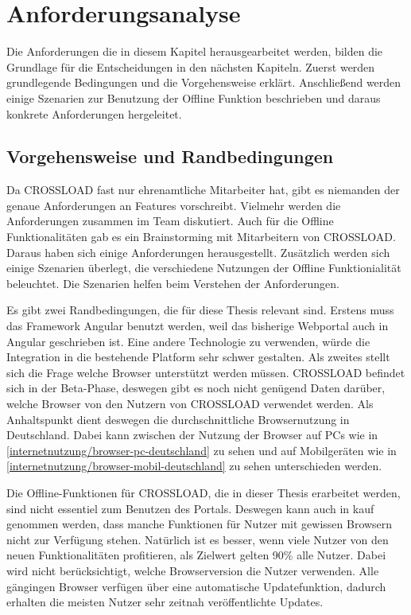 \chapter{Anforderungsanalyse}
\label{Kap3}
Die Anforderungen die in diesem Kapitel herausgearbeitet werden, bilden die Grundlage für die Entscheidungen in den nächsten Kapiteln. Zuerst werden grundlegende Bedingungen und die Vorgehensweise erklärt. Anschließend werden einige Szenarien zur Benutzung der Offline Funktion beschrieben und daraus konkrete Anforderungen hergeleitet.

\section{Vorgehensweise und Randbedingungen}
Da CROSSLOAD fast nur ehrenamtliche Mitarbeiter hat, gibt es niemanden der genaue Anforderungen an Features vorschreibt. Vielmehr werden die Anforderungen zusammen im Team diskutiert. Auch für die Offline Funktionalitäten gab es ein Brainstorming mit Mitarbeitern von CROSSLOAD. Daraus haben sich einige Anforderungen herausgestellt. Zusätzlich werden sich einige Szenarien überlegt, die verschiedene Nutzungen der Offline Funktionialität beleuchtet. Die Szenarien helfen beim Verstehen der Anforderungen.

Es gibt zwei Randbedingungen, die für diese Thesis relevant sind. Erstens muss das Framework Angular benutzt werden, weil das bisherige Webportal auch in Angular geschrieben ist. Eine andere Technologie zu verwenden, würde die Integration in die bestehende Platform sehr schwer gestalten. Als zweites stellt sich die Frage welche Browser unterstützt werden müssen. CROSSLOAD befindet sich in der Beta-Phase, deswegen gibt es noch nicht genügend Daten darüber, welche Browser von den Nutzern von CROSSLOAD verwendet werden. Als Anhaltspunkt dient deswegen die durchschnittliche Browsernutzung in Deutschland. Dabei kann zwischen der Nutzung der Browser auf PCs wie in \autoref{internetnutzung/browser-pc-deutschland} zu sehen und auf Mobilgeräten wie in \autoref{internetnutzung/browser-mobil-deutschland} zu sehen unterschieden werden.



Die Offline-Funktionen für CROSSLOAD, die in dieser Thesis erarbeitet werden, sind nicht essentiel zum Benutzen des Portals. Deswegen kann auch in kauf genommen werden, dass manche Funktionen für Nutzer mit gewissen Browsern nicht zur Verfügung stehen. Natürlich ist es besser, wenn viele Nutzer von den neuen Funktionalitäten profitieren, als Zielwert gelten 90\% alle Nutzer. Dabei wird nicht berücksichtigt, welche Browserversion die Nutzer verwenden. Alle gängingen Browser verfügen über eine automatische Updatefunktion, dadurch erhalten die meisten Nutzer sehr zeitnah veröffentlichte Updates.

